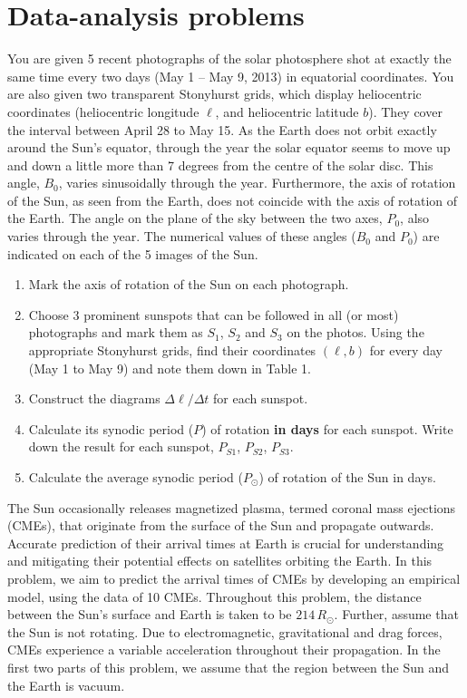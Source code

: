 \section*{Data-analysis problems}

You are given 5 recent photographs of the solar photosphere shot at exactly the
same time every two days (May 1 -- May 9, 2013) in equatorial coordinates. You
are also given two transparent Stonyhurst grids, which display heliocentric
coordinates (heliocentric longitude $\ell$, and heliocentric latitude $b$). They
cover the interval between April 28 to May 15. As the Earth does not orbit
exactly around the Sun's equator, through the year the solar equator seems to
move up and down a little more than 7 degrees from the centre of the solar disc.
This angle, $B_0$, varies sinusoidally through the year. Furthermore, the axis
of rotation of the Sun, as seen from the Earth, does not coincide with the axis
of rotation of the Earth. The angle on the plane of the sky between the two
axes, $P_0$, also varies through the year. The numerical values of these angles
($B_0$ and $P_0$) are indicated on each of the 5 images of the Sun.

\begin{enumerate}
\item Mark the axis of rotation of the Sun on each photograph.
\item Choose 3 prominent sunspots that can be followed in all (or most)
  photographs and mark them as $S_1$, $S_2$ and $S_3$ on the photos. Using the
  appropriate Stonyhurst grids, find their coordinates $(\ell, b)$ for every day
  (May 1 to May 9) and note them down in Table 1.
\item Construct the diagrams $\Delta\ell/\Delta t$ for each sunspot.
\item Calculate its synodic period ($P$) of rotation \textbf{in days} for each
  sunspot. Write down the result for each sunspot, $P_{S1}$, $P_{S2}$,
  $P_{S3}$.
\item Calculate the average synodic period ($P_\odot$) of rotation of the Sun
  in days.
\end{enumerate}

The Sun occasionally releases magnetized plasma, termed coronal mass
ejections (CMEs), that originate from the surface of the Sun and propagate
outwards. Accurate prediction of their arrival times at Earth is crucial for
understanding and mitigating their potential effects on satellites orbiting
the Earth. In this problem, we aim to predict the arrival times of CMEs by
developing an empirical model, using the data of 10 CMEs. Throughout this
problem, the distance between the Sun's surface and Earth is taken to be
$214\,R_\odot$. Further, assume that the Sun is not rotating. Due to
electromagnetic, gravitational and drag forces, CMEs experience a variable
acceleration throughout their propagation. In the first two parts of this
problem, we assume that the region between the Sun and the Earth is vacuum.

